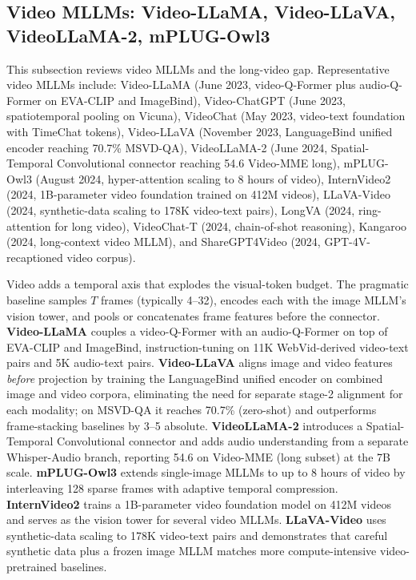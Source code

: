\documentclass{article}
\begin{document}
\subsection{Video MLLMs: Video-LLaMA, Video-LLaVA, VideoLLaMA-2, mPLUG-Owl3}\label{video-mllms-video-llama-video-llava-videollama-2-mplug-owl3}

This subsection reviews video MLLMs and the long-video gap. Representative video MLLMs include: Video-LLaMA (June 2023, video-Q-Former plus audio-Q-Former on EVA-CLIP and ImageBind), Video-ChatGPT (June 2023, spatiotemporal pooling on Vicuna), VideoChat (May 2023, video-text foundation with TimeChat tokens), Video-LLaVA (November 2023, LanguageBind unified encoder reaching 70.7\% MSVD-QA), VideoLLaMA-2 (June 2024, Spatial-Temporal Convolutional connector reaching 54.6 Video-MME long), mPLUG-Owl3 (August 2024, hyper-attention scaling to 8 hours of video), InternVideo2 (2024, 1B-parameter video foundation trained on 412M videos), LLaVA-Video (2024, synthetic-data scaling to 178K video-text pairs), LongVA (2024, ring-attention for long video), VideoChat-T (2024, chain-of-shot reasoning), Kangaroo (2024, long-context video MLLM), and ShareGPT4Video (2024, GPT-4V-recaptioned video corpus).

Video adds a temporal axis that explodes the visual-token budget. The pragmatic baseline samples \(T\) frames (typically 4--32), encodes each with the image MLLM's vision tower, and pools or concatenates frame features before the connector. \textbf{Video-LLaMA} \citep{zhang2023videollamaaninstru} couples a video-Q-Former with an audio-Q-Former on top of EVA-CLIP and ImageBind, instruction-tuning on 11K WebVid-derived video-text pairs and 5K audio-text pairs. \textbf{Video-LLaVA} \citep{lin20242024} aligns image and video features \emph{before} projection by training the LanguageBind unified encoder on combined image and video corpora, eliminating the need for separate stage-2 alignment for each modality; on MSVD-QA it reaches 70.7\% (zero-shot) and outperforms frame-stacking baselines by 3--5 absolute. \textbf{VideoLLaMA-2} \citep{cheng20242024} introduces a Spatial-Temporal Convolutional connector and adds audio understanding from a separate Whisper-Audio branch, reporting 54.6 on Video-MME (long subset) at the 7B scale. \textbf{mPLUG-Owl3} \citep{ye20242024} extends single-image MLLMs to up to 8 hours of video by interleaving 128 sparse frames with adaptive temporal compression. \textbf{InternVideo2} \citep{wang20242024} trains a 1B-parameter video foundation model on 412M videos and serves as the vision tower for several video MLLMs. \textbf{LLaVA-Video} \citep{zhang20242024} uses synthetic-data scaling to 178K video-text pairs and demonstrates that careful synthetic data plus a frozen image MLLM matches more compute-intensive video-pretrained baselines.
\end{document}
